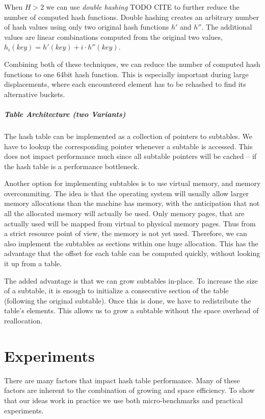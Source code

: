 \documentclass[a4paper,UKenglish]{lipics-v2016}
\begin{document}
When $H > 2$ we can use \emph{double hashing} TODO CITE to further reduce the number
of computed hash functions. Double hashing creates an arbitrary number
of hash values using only two original hash functions $h'$ and
$h''$.  The additional values are linear combinations computed
from the original two values, $h_i(key) = h'(key) + i\cdot
h''(key)$.

Combining both of these techniques, we can reduce the number of
computed hash functions to one 64bit hash function.  This is
especially important during large displacements, where each
encountered element has to be rehashed to find its alternative
buckets.

\subparagraph*{Table Architecture (two Variants)}
\label{sec:dys_inplace}
The hash table can be implemented as a collection of pointers to
subtables. We have to lookup the corresponding pointer whenever a
subtable is accessed.  This does not impact performance much since all
subtable pointers will be cached -- if the hash table is a performance bottleneck.

Another option for implementing subtables is to use virtual memory,
and memory overcommiting.  The idea is that the operating system will
usually allow larger memory allocations than the machine has memory,
with the anticipation that not all the allocated memory will actually
be used.  Only memory pages, that are actually used will be mapped
from virtual to physical memory pages.  Thus from a strict resource
point of view, the memory is not yet used.  Therefore, we can also
implement the subtables as sections within one huge allocation.  This
has the advantage that the offset for each table can be computed
quickly, without looking it up from a table.

The added advantage is that we can grow subtables in-place.  To
increase the size of a subtable, it is enough to initialize a
consecutive section of the table (following the original subtable).
Once this is done, we have to redistribute the table's elements.  This
allows us to grow a subtable without the space overhead of
reallocation.

\section{Experiments}
\label{sec:exp}
There are many factors that impact hash table performance.  Many of
these factors are inherent to the combination of growing and space
efficiency.  To show that our ideas work in practice we use both
micro-benchmarks and practical experiments.
\end{document}
